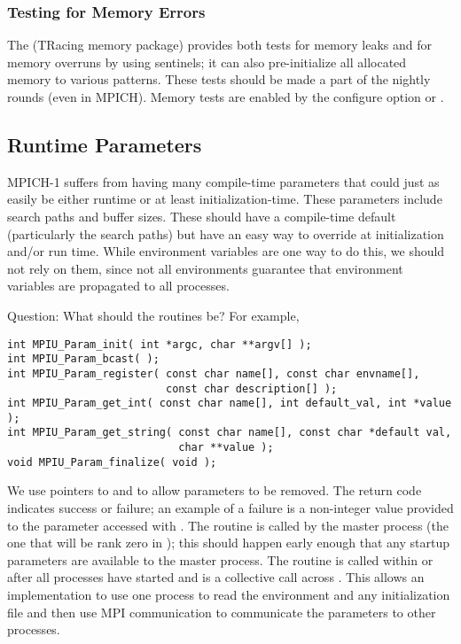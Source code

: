 \documentclass{article}
\begin{document}
\subsubsection{Testing for Memory Errors}
The  (TRacing memory package) provides both tests for memory
leaks and for memory overruns by using sentinels; it can also
pre-initialize all allocated memory to various patterns.  These tests
should be made a part of the nightly rounds (even in MPICH).  
Memory tests are enabled by the configure option
 or .

\subsection{Runtime Parameters}
\label{sec:runtime-params}
MPICH-1 suffers from having many compile-time parameters that could just as
easily be either runtime or at least initialization-time.  These parameters
include search paths and buffer sizes.  These should have a compile-time
default (particularly the search paths) but have an easy way to override at
initialization and/or run time.  While environment variables are one way to do
this, we should not rely on them, since not all environments guarantee that
environment variables are propagated to all processes.

Question: What should the routines be?  For 
example,%
%
\begin{verbatim}
int MPIU_Param_init( int *argc, char **argv[] );
int MPIU_Param_bcast( );
int MPIU_Param_register( const char name[], const char envname[], 
                         const char description[] );
int MPIU_Param_get_int( const char name[], int default_val, int *value );
int MPIU_Param_get_string( const char name[], const char *default val,
                           char **value );
void MPIU_Param_finalize( void );
\end{verbatim}
We use pointers to  and  to allow parameters to be
removed.  The return code indicates success or failure; an example of a
failure is a non-integer value provided to the parameter accessed with
. 
The routine  is called by the master process (the one
that will be rank zero in ); this should happen early
enough that any startup parameters are available to the master process.  The
routine  is called within  or
 after all processes have started and is a collective
call across .  This allows an implementation to use one
process to read the environment and any initialization file and then use MPI
communication to communicate the parameters to other processes.  
\end{document}
